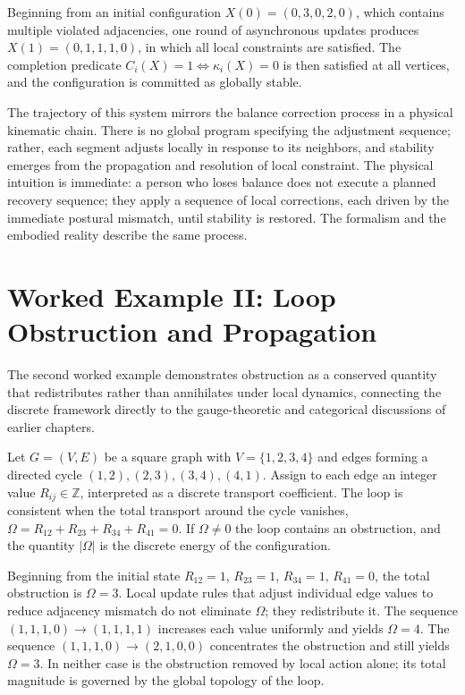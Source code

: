 \documentclass[12pt,a4paper,openany]{book}
\theoremstyle{plain}
\theoremstyle{definition}
\theoremstyle{remark}
\begin{document}
Beginning from an initial configuration $X(0) = (0, 3, 0, 2, 0)$, which contains multiple violated adjacencies, one round of asynchronous updates produces $X(1) = (0, 1, 1, 1, 0)$, in which all local constraints are satisfied. The completion predicate $C_i(X) = 1 \iff \kappa_i(X) = 0$ is then satisfied at all vertices, and the configuration is committed as globally stable.

The trajectory of this system mirrors the balance correction process in a physical kinematic chain. There is no global program specifying the adjustment sequence; rather, each segment adjusts locally in response to its neighbors, and stability emerges from the propagation and resolution of local constraint. The physical intuition is immediate: a person who loses balance does not execute a planned recovery sequence; they apply a sequence of local corrections, each driven by the immediate postural mismatch, until stability is restored. The formalism and the embodied reality describe the same process.

\section{Worked Example II: Loop Obstruction and Propagation}

The second worked example demonstrates obstruction as a conserved quantity that redistributes rather than annihilates under local dynamics, connecting the discrete framework directly to the gauge-theoretic and categorical discussions of earlier chapters.

Let $G = (V, E)$ be a square graph with $V = \{1, 2, 3, 4\}$ and edges forming a directed cycle $(1,2), (2,3), (3,4), (4,1)$. Assign to each edge an integer value $R_{ij} \in \mathbb{Z}$, interpreted as a discrete transport coefficient. The loop is consistent when the total transport around the cycle vanishes, $\Omega = R_{12} + R_{23} + R_{34} + R_{41} = 0$. If $\Omega \neq 0$ the loop contains an obstruction, and the quantity $|\Omega|$ is the discrete energy of the configuration.

Beginning from the initial state $R_{12} = 1$, $R_{23} = 1$, $R_{34} = 1$, $R_{41} = 0$, the total obstruction is $\Omega = 3$. Local update rules that adjust individual edge values to reduce adjacency mismatch do not eliminate $\Omega$; they redistribute it. The sequence $(1, 1, 1, 0) \to (1, 1, 1, 1)$ increases each value uniformly and yields $\Omega = 4$. The sequence $(1, 1, 1, 0) \to (2, 1, 0, 0)$ concentrates the obstruction and still yields $\Omega = 3$. In neither case is the obstruction removed by local action alone; its total magnitude is governed by the global topology of the loop.
\end{document}

